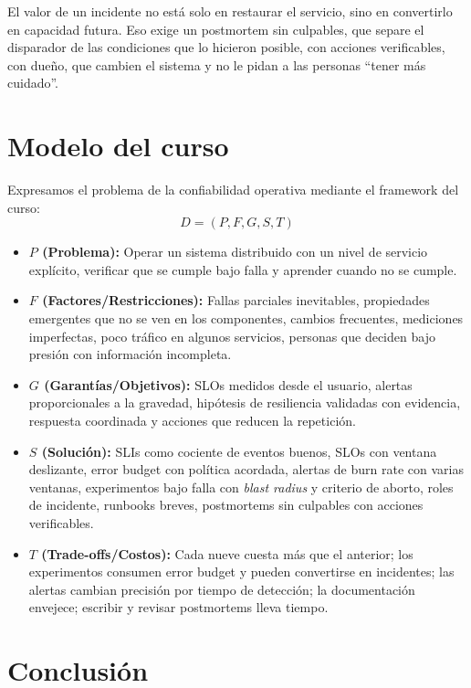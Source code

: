 \documentclass[variant=apuntes,cover=institutional,mode=screen]{ua-engineering-v6-article}
\begin{document}
\begin{uakeybox}
El valor de un incidente no está solo en restaurar el servicio, sino en convertirlo en capacidad futura. Eso exige un postmortem sin culpables, que separe el disparador de las condiciones que lo hicieron posible, con acciones verificables, con dueño, que cambien el sistema y no le pidan a las personas ``tener más cuidado''.
\end{uakeybox}

\section{Modelo del curso}

Expresamos el problema de la confiabilidad operativa mediante el framework del curso:
\[
D = (P, F, G, S, T)
\]

\begin{itemize}
\item \textbf{$P$ (Problema):} Operar un sistema distribuido con un nivel de servicio explícito, verificar que se cumple bajo falla y aprender cuando no se cumple.
\item \textbf{$F$ (Factores/Restricciones):} Fallas parciales inevitables, propiedades emergentes que no se ven en los componentes, cambios frecuentes, mediciones imperfectas, poco tráfico en algunos servicios, personas que deciden bajo presión con información incompleta.
\item \textbf{$G$ (Garantías/Objetivos):} SLOs medidos desde el usuario, alertas proporcionales a la gravedad, hipótesis de resiliencia validadas con evidencia, respuesta coordinada y acciones que reducen la repetición.
\item \textbf{$S$ (Solución):} SLIs como cociente de eventos buenos, SLOs con ventana deslizante, error budget con política acordada, alertas de burn rate con varias ventanas, experimentos bajo falla con \emph{blast radius} y criterio de aborto, roles de incidente, runbooks breves, postmortems sin culpables con acciones verificables.
\item \textbf{$T$ (Trade-offs/Costos):} Cada nueve cuesta más que el anterior; los experimentos consumen error budget y pueden convertirse en incidentes; las alertas cambian precisión por tiempo de detección; la documentación envejece; escribir y revisar postmortems lleva tiempo.
\end{itemize}

\section{Conclusión}
\end{document}
